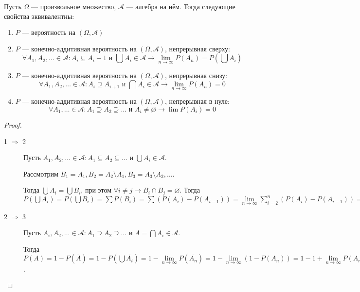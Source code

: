 \begin{Th}
  Пусть $\Omega$ --- произвольное множество, $\mathcal{A} $ --- алгебра на нём. Тогда следующие свойства эквивалентны:
  \begin{enumerate}
	\item $P$ --- вероятность на $(\Omega, \mathcal{A})$
	\item $P$ --- конечно-аддитивная вероятность на $(\Omega, \mathcal{A})$, непрерывная сверху: 
	  \[
		\forall A_1, A_2, \ldots \in \mathcal{A}:  A_i \subseteq A_i+1 \mbox{ и } \bigcup A_i \in \mathcal{A} \to \lim\limits_{n\to\infty} P(A_n) = P(\bigcup A_i)
	  \]
	\item $P$ --- конечно-аддитивная вероятность на $(\Omega, \mathcal{A})$, непрерывная снизу:
	  \[
		\forall A_1, A_2, \ldots \in \mathcal{A}:  A_i \supseteq A_{i+1} \mbox{ и } \bigcap A_i \in \mathcal{A} \to \lim\limits_{n\to\infty} P(A_n) = 0
	  \]
	\item $P$ --- конечно-аддитивная вероятность на $(\Omega, \mathcal{A})$, непрерывная в нуле:
	  \[
		\forall A_1, \ldots \in \mathcal{A}: A_1 \supseteq A_2 \supseteq \ldots \mbox{ и } A_i \neq \varnothing \to \lim P(A_i) = 0
	  \]
  \end{enumerate}

  \begin{proof} $ $
	\begin{description}
	  \item [1 $\Rightarrow$ 2] Пусть $A_1, A_2, \ldots \in \mathcal{A}: A_1 \subseteq A_2 \subseteq \ldots$ и $\bigcup A_i \in \mathcal{A} $. 
		
		Рассмотрим $B_1 = A_1, B_2 = A_2\setminus A_1, B_3 = A_3 \setminus A_2, \ldots$. 
		
		Тогда $\bigcup A_i = \bigcup B_i$, при этом $\forall i \neq j \to B_i \cap B_j = \varnothing$. Тогда $P(\bigcup A_i) = P(\bigcup B_i) = 
		\sum P(B_i) = \sum (P(A_i) - P(A_{i-1})) = \lim\limits_{n\to\infty} \sum\limits_{i=2}^{n} (P(A_i) - P(A_{i-1})) = \lim\limits_{n\to\infty} P(A_n)$

	  \item [2 $\Rightarrow$ 3] Пусть $A_i, A_2, \ldots \in \mathcal{A}: A_1 \supseteq A_2 \supseteq \ldots \mbox{ и } A = \bigcap A_i \in \mathcal{A}$.

		Тогда $P(A) = 1 - P(\overline{A}) = 1 - P(\bigcup \overline{A_i}) = 1 - \lim\limits_{n\to\infty} P(\overline{A_n}) = 
		1 - \lim\limits_{n\to\infty}(1 - P(A_n)) = 1 - 1 + \lim\limits_{n\to\infty} P(A_n)$.


\end{description}
\end{proof}
\end{Th}
